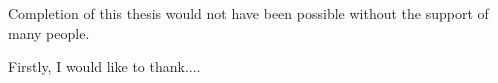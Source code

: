 Completion of this thesis would not have been possible without the support of many people.   

Firstly, I would like to thank....